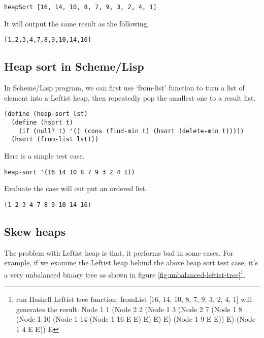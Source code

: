 \documentclass{article}
\begin{document}
\begin{lstlisting}
heapSort [16, 14, 10, 8, 7, 9, 3, 2, 4, 1]
\end{lstlisting}

It will output the same result as the following.

\begin{verbatim}
[1,2,3,4,7,8,9,10,14,16]
\end{verbatim}

\subsection*{Heap sort in Scheme/Lisp}

In Scheme/Lisp program, we can first use `from-list' function
to turn a list of element into a Leftist heap, then repeatedly
pop the smallest one to a result list.

\lstset{language=lisp}
\begin{lstlisting}
(define (heap-sort lst)
  (define (hsort t)
    (if (null? t) '() (cons (find-min t) (hsort (delete-min t)))))
  (hsort (from-list lst)))
\end{lstlisting}

Here is a simple test case.

\begin{lstlisting}
heap-sort '(16 14 10 8 7 9 3 2 4 1))
\end{lstlisting}

Evaluate the case will out put an ordered list.

\begin{lstlisting}
(1 2 3 4 7 8 9 10 14 16)
\end{lstlisting}



\subsection{Skew heaps}
\label{skew-heap}

The problem with Leftist heap is that, it performs bad in some cases.
For example, if we examine the Leftist heap behind the above heap
sort test case, it's a very unbalanced binary tree as shown in figure
\ref{fig:unbalanced-leftist-tree}\footnote{run Haskell Leftist tree
function: fromList [16, 14, 10, 8, 7, 9, 3, 2, 4, 1] will generates
the result: Node 1 1 (Node 2 2 (Node 1 3 (Node 2 7 (Node 1 8 (Node 1 10 (Node 1 14 (Node 1 16 E E) E) E) E) (Node 1 9 E E)) E) (Node 1 4 E E)) E}.
\end{document}
